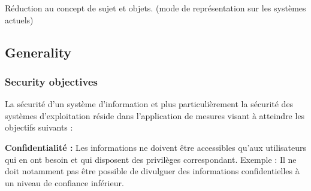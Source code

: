 \documentclass[pdftex,a4paper,titlepage,11pt]{article}
\begin{document}



Réduction au concept de sujet et objets. (mode de représentation sur les systèmes actuels)

\subsection{Generality}

\subsubsection{Security objectives}

La sécurité d'un système d'information et plus particulièrement la sécurité des systèmes d'exploitation réside dans l'application de mesures visant à atteindre les objectifs suivants :

\textbf{Confidentialité :}
Les informations ne doivent être accessibles qu'aux utilisateurs qui en ont besoin et qui disposent des privilèges correspondant. Exemple : Il ne doit notamment pas être possible de divulguer des informations confidentielles à un niveau de confiance inférieur.
\end{document}
